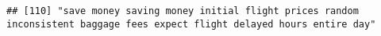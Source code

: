 \documentclass[
]{article}
\begin{document}
\begin{verbatim}
## [110] "save money saving money initial flight prices random inconsistent baggage fees expect flight delayed hours entire day"                                                                                                                                                                                                                                                                                                                                                                                                                                                                                                                                                                                                                                                                                                                                                                                                                                                                                                                                                                                                                                                                                                                                                                                                                                                                                                                                                                                                                                                                                                                                                                                                                                                                         

\end{verbatim}
\end{document}
